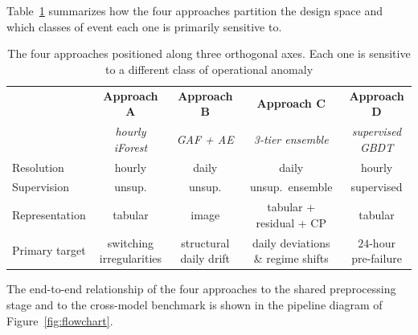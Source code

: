 \documentclass{article}
\begin{document}
Table~\ref{tab:four_perspectives} summarizes how the four approaches partition the design space and which classes of event each one is primarily sensitive to.

\begin{table}[H]
\centering
\caption{The four approaches positioned along three orthogonal axes. Each one is sensitive to a different class of operational anomaly}
\label{tab:four_perspectives}
\small
\begin{tabular}{lcccc}
\toprule
& \textbf{Approach A} & \textbf{Approach B} & \textbf{Approach C} & \textbf{Approach D}\\
& \emph{hourly iForest} & \emph{GAF + AE} & \emph{3-tier ensemble} & \emph{supervised GBDT}\\
\midrule
Resolution     & hourly  & daily   & daily   & hourly\\
Supervision    & unsup.  & unsup.  & unsup.\ ensemble & supervised\\
Representation & tabular & image   & tabular + residual + CP & tabular\\
Primary target & switching irregularities & structural daily drift & daily deviations \& regime shifts & $24$-hour pre-failure\\
\bottomrule
\end{tabular}
\end{table}

The end-to-end relationship of the four approaches to the shared preprocessing stage and to the cross-model benchmark is shown in the pipeline diagram of Figure~\ref{fig:flowchart}.
\end{document}

